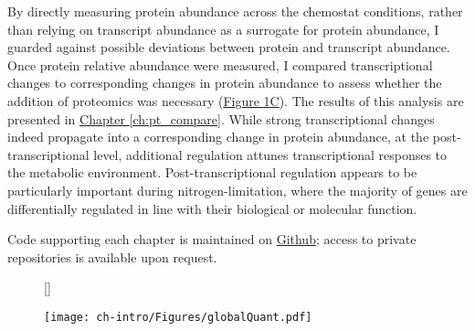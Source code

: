 By directly measuring protein abundance across the chemostat conditions, rather than relying on transcript abundance as a surrogate for protein abundance, I guarded against possible deviations between protein and transcript abundance. Once protein relative abundance were measured, I compared transcriptional changes to corresponding changes in protein abundance to assess whether the addition of proteomics was necessary (\hyperref[introFig:primarytopics]{Figure \ref{introFig:primarytopics}C}). The results of this analysis are presented in \hyperref[ch:pt_compare]{Chapter \ref{ch:pt_compare}}.  While strong transcriptional changes  indeed propagate into a corresponding change in protein abundance, at the post-transcriptional level, additional regulation attunes transcriptional responses to the metabolic environment. Post-transcriptional regulation appears to be particularly important during nitrogen-limitation, where the majority of genes are differentially regulated in line with their biological or molecular function.

Code supporting each chapter is maintained on \href{https://github.com/shackett}{Github}; access to private repositories is available upon request.

\begin{figure}[h!]
[\FBwidth]
{\caption[Summary of primary thesis topics]{}\label{introFig:primarytopics}}
{\texttt{[image: ch-intro/Figures/globalQuant.pdf]}}
\end{figure}

